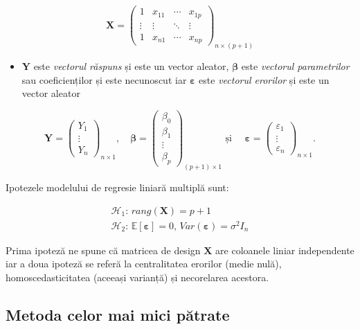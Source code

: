 \documentclass[]{article}
\providecommand{\tightlist}{%
  \setlength{\itemsep}{0pt}\setlength{\parskip}{0pt}}
\begin{document}
\[
\mathbf{X}=\begin{pmatrix}
1 & x_{11} & \cdots & x_{1p}\\
\vdots & \vdots & \ddots & \vdots\\
1 & x_{n1} & \cdots & x_{np}
\end{pmatrix}_{n\times(p+1)}
\]

\begin{itemize}
\tightlist
\item
  \(\mathbf{Y}\) este \emph{vectorul răspuns} și este un vector aleator,
  \(\boldsymbol\beta\) este \emph{vectorul parametrilor} sau
  coeficienților și este necunoscut iar \(\boldsymbol\varepsilon\) este
  \emph{vectorul erorilor} și este un vector aleator
\end{itemize}

\[
\mathbf{Y}=\begin{pmatrix}
Y_1 \\
\vdots \\
Y_n
\end{pmatrix}_{n\times 1},\quad\boldsymbol\beta=\begin{pmatrix}
\beta_0 \\
\beta_1 \\
\vdots \\
\beta_p
\end{pmatrix}_{(p+1)\times 1}\text{ și }\quad
\boldsymbol\varepsilon=\begin{pmatrix}
\varepsilon_1 \\
\vdots \\
\varepsilon_n
\end{pmatrix}_{n\times 1}.
\]

Ipotezele modelului de regresie liniară multiplă sunt:

\[
  \begin{array}{ll}
    \mathcal{H}_1: \, rang(\boldsymbol X) = p+1\\
    \mathcal{H}_2: \, \mathbb{E}[\boldsymbol \varepsilon] = 0,\, Var(\boldsymbol \varepsilon) = \sigma^2 I_n
  \end{array}
\]

Prima ipoteză ne spune că matricea de design \(\boldsymbol X\) are
coloanele liniar independente iar a doua ipoteză se referă la
centralitatea erorilor (medie nulă), homoscedasticitatea (aceeași
varianță) și necorelarea acestora.

\subsection{Metoda celor mai mici
pătrate}\label{metoda-celor-mai-mici-patrate}
\end{document}

